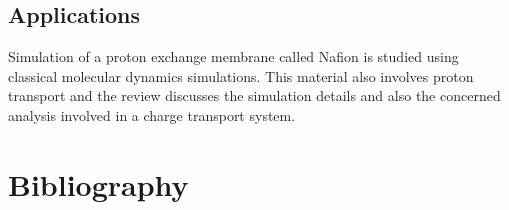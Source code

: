 \documentclass{article}
\begin{document}
\subsection{Applications}
\label{sec-2-3}
Simulation of a proton exchange membrane called Nafion is studied \cite{devanathan-2007-atomis-simul} using classical molecular dynamics simulations. This material also involves proton transport and the review discusses the simulation details and also the concerned analysis involved in a charge transport system.


\section{Bibliography}
\label{sec-3}



\end{document}
